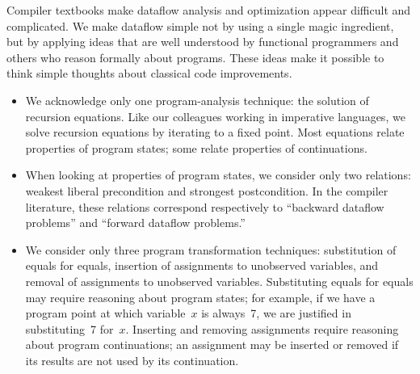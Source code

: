 \documentclass[blockstyle,preprint,nocopyrightspace]{sigplanconf}
\let\cite\citep
\newcommand{\authornote}[1]{{\em #1}}
\def\authornote#1{\unskip\relax}
\newcommand{\norman}[1]{\authornote{NR: #1}}
\let\remark\norman
\newcommand\secref[1]{Section~\ref{sec:#1}}
\begin{document}
Compiler textbooks make dataflow analysis and optimization appear
difficult and complicated.
We make dataflow simple not by using a single magic
ingredient, but by applying ideas that are well understood by functional
programmers and others who reason formally about programs.
These ideas
make it possible to think simple thoughts about classical code improvements.
\begin{itemize}
\item
We acknowledge only one program-analysis technique: the solution of
recursion equations.
Like our colleagues working in imperative languages, we solve
recursion equations by iterating to a fixed point.
Most equations relate
properties of program states; some relate properties of continuations.
\item
When looking at properties of program states, we consider only two
relations: weakest liberal precondition and strongest 
postcondition.
In the compiler literature, these relations correspond respectively to
``backward dataflow problems'' and ``forward dataflow problems.''
\item
We consider only three program transformation techniques:
substitution of equals for equals, 
insertion of assignments to unobserved variables, 
and removal of assignments to unobserved variables.
Substituting equals for equals may require reasoning about program
states; for example, if we have a program point at which variable~$x$
is always~7, we are justified in substituting~7 for~$x$.
\remark{We can also justify substitution of \emph{labels} in goto
  statements by reasoning about continuations.  The introduction is
  probably not the place to mention this fact.}
Inserting and removing assignments require reasoning about program
continuations; an assignment may be inserted or removed if its results
are not used by its continuation.


\end{itemize}
\end{document}
